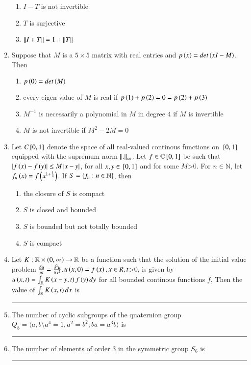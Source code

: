 \documentclass[journal]{IEEEtran}
\begin{document}
\begin{enumerate}
{\begin{multicols}{2}
\begin{enumerate}
\item $I-T$ is not invertible
\item $T$ is surjective 
\item $\left\lVert I+T\right\rVert=1+\left\lVert T\right\rVert$
\end{enumerate}
\end{multicols}
}
\item{
Suppose that $M$ is a $5\times 5$ matrix with real entries and $p\left(x\right)=det\left(xI-M\right)$. Then
\begin{enumerate}
\item $p\left(0\right)=det\left(M\right)$
\item every eigen value of $M$ is real if $p\left(1\right)+p\left(2\right)=0=p\left(2\right)+p\left(3\right)$
\item $M^{-1}$ is necessarily a polynomial in $M$ in degree $4$ if $M$ is invertible 
\item $M$ is not invertible if $M^2-2M=0$ 
\end{enumerate}
}
\item{
Let $C{}\left[0,1\right]$ denote the space of all real-valued continous functions on ${}\left[0,1\right]$ equipped with the supremum norm $\left\lVert.\right\rVert_{\infty}$. Let $f\in\mathbb{C}{}\left[0,1\right]$ be such that $\left\vert f\left(x\right)-f\left(y\right)\right\vert\leq M\left\vert x-y\right\vert$, for all $x,y\in{}\left[0,1\right]$ and for some $M$\textgreater$0$. For $n\in\mathbb{N}$, let $f_n\left(x\right)=f\left(x^{1+\frac{1}{n}}\right)$. If $S=\left\{f_n:n\in\mathbb{N}\right\}$, then 
\begin{multicols}{2}
\begin{enumerate}
\item the closure of $S$ is compact
\item $S$ is closed and bounded
\item $S$ is bounded but not totally bounded
\item $S$ is compact
\end{enumerate}
\end{multicols}
}
\item{
Let $K:\mathbb{R}\times\left(0,\infty\right)\rightarrow\mathbb{R}$ be a function such that the solution of the initial value problem $\frac{\delta u}{\delta t}=\frac{\delta^2u}{\delta x^2},u\left(x,0\right)=f\left(x\right),x\in R,t$\textgreater$0$, is given by $u\left(x,t\right)=\int_\mathbb{R}K\left(x-y,t\right)f\left(y\right)dy$ for all bounded continous functions $f$, Then the value of $\int_\mathbb{R}K\left(x,t\right)dx$ is \rule{2cm}{0.15mm}
}
\item{
The number of cyclic subgroups of the quaternion group $Q_8=\langle a,b\text{\textbackslash}a^4=1,a^2=b^2,ba=a^3b\rangle$ is \rule{2cm}{0.15mm}
}
\item{
The number of elements of order $3$ in the symmetric group $S_6$ is \rule{2cm}{0.15mm}
}
\end{enumerate}
\end{document}
